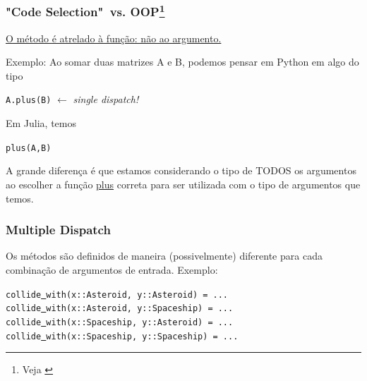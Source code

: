 \documentclass{beamer}
\begin{document}
\begin{frame}
	\frametitle{"Code Selection"\ vs. OOP\footnote{Veja \cite{juliapaper}}}
	\begin{center}
		\underline{O método é atrelado à função: não ao argumento.}
    \end{center}
    Exemplo: Ao somar duas matrizes A e B, podemos pensar em Python em algo do tipo
    \begin{center}
		 \texttt{A.plus(B)} $\leftarrow $ \emph{single dispatch!}
    \end{center}
    Em Julia, temos
    \begin{center}
    	\texttt{plus(A,B)}
    \end{center}
    A grande diferença é que estamos considerando o tipo de TODOS os argumentos ao escolher a função \underline{plus} correta para ser utilizada com o tipo de argumentos que temos.
\end{frame}

\begin{frame}
  \frametitle{Multiple Dispatch}
  Os métodos são definidos de maneira (possivelmente) diferente para cada combinação de argumentos de entrada.
\vfill
  Exemplo:
  \begin{center}
  \begin{minipage}{10cm}
    \texttt{collide\underline{\ }with(x::Asteroid,  y::Asteroid)  = ... }\\
    \texttt{collide\underline{\ }with(x::Asteroid,  y::Spaceship) = ... }\\
    \texttt{collide\underline{\ }with(x::Spaceship, y::Asteroid)  = ... }\\
    \texttt{collide\underline{\ }with(x::Spaceship, y::Spaceship) = ... }
  \end{minipage}
  \end{center}
\end{frame}
\end{document}
